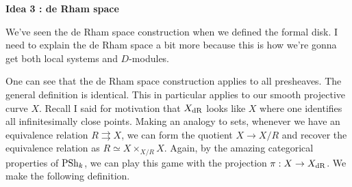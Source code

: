 \documentclass[./main.tex]{subfiles}
\begin{document}
\textbf{Idea 3 : de Rham space}

We've seen the de Rham space construction
when we defined the formal disk.
I need to explain the de Rham space a bit more
because this is how we're gonna get both local systems and $D$-modules.

One can see that the de Rham space construction
applies to all presheaves.
The general definition is identical.
This in particular applies to our smooth projective curve $X$.
Recall I said for motivation that 
$X_{\mathrm{dR}}$ looks like $X$ where one identifies all infinitesimally close points.
Making an analogy to sets,
whenever we have an equivalence relation $R \rightrightarrows X$,
we can form the quotient $X \to X / R$ and recover the equivalence relation
as $R \simeq X \times_{X / R} X$.
Again, by the amazing categorical properties of $\operatorname{PSh}_k$,
we can play this game with the projection $\pi : X \to X_{\mathrm{dR}}$.
We make the following definition. 
\end{document}
